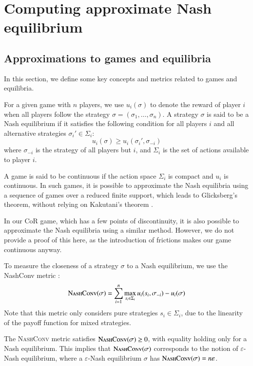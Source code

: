 \documentclass[preprint,12pt,authoryear,doubleblind]{elsarticle}
\theoremstyle{definition}
\begin{document}
\section{Computing approximate Nash equilibrium}

\subsection{Approximations to games and equilibria}
\label{sec:approx}

In this section, we define some key concepts and metrics related to games and equilibria. 

For a given game with $n$ players, we use $u_i(\sigma)$ to denote the reward of player $i$ when all players follow the strategy $\sigma = (\sigma_1, \ldots, \sigma_n)$. A strategy $\sigma$ is said to be a Nash equilibrium if it satisfies the following condition for all players $i$ and all alternative strategies $\sigma_i' \in \Sigma_i$: 
$$u_i(\sigma) \ge u_i(\sigma_i', \sigma_{-i})$$ 
where $\sigma_{-i}$ is the strategy of all players but $i$, and $\Sigma_i$ is the set of actions available to player $i$. 

A game is said to be continuous if the action space $\Sigma_i$ is compact and $u_i$ is continuous. In such games, it is possible to approximate the Nash equilibria using a sequence of games over a reduced finite support, which leads to Glicksberg’s theorem, without relying on Kakutani’s theorem \citep{myerson1997game}. 

In our CoR game, which has a few points of discontinuity, it is also possible to approximate the Nash equilibria using a similar method. However, we do not provide a proof of this here, as the introduction of frictions makes our game continuous anyway. 

To measure the closeness of a strategy $\sigma$ to a Nash equilibrium, we use the NashConv metric \citep{Lanctot2017-wc}: 
$$\textsc{NashConv}(\sigma) = \sum_{i=1}^n \max_{s_i \in \Sigma_i} u_i(s_i, \sigma_{-i}) - u_i(\sigma)$$
Note that this metric only considers pure strategies $s_i \in \Sigma_i$, due to the linearity of the payoff function for mixed strategies. 

The \textsc{NashConv} metric satisfies $\textsc{NashConv}(\sigma) \ge 0$, with equality holding only for a Nash equilibrium. This implies that $\textsc{NashConv}(\sigma)$ corresponds to the notion of $\varepsilon$-Nash equilibrium, where a $\varepsilon$-Nash equilibrium $\sigma$ has $\textsc{NashConv}(\sigma) = n \varepsilon$. 
\end{document}
